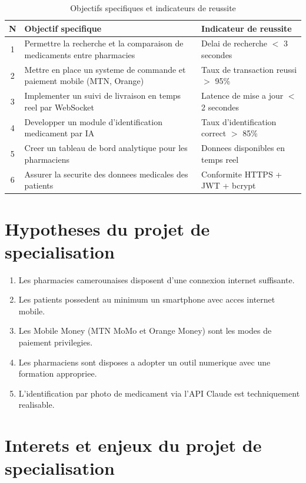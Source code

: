 \documentclass[12pt,a4paper]{report}
\begin{document}
\begin{table}[ht]
\centering
\caption{Objectifs specifiques et indicateurs de reussite}
\renewcommand{\arraystretch}{1.5}
\begin{tabularx}{\textwidth}{|c|X|X|}
\hline
\rowcolor{vertpharma!20}
\textbf{N} & \textbf{Objectif specifique} & \textbf{Indicateur de reussite} \\ \hline
1 & Permettre la recherche et la comparaison de medicaments entre pharmacies & Delai de recherche $<$ 3 secondes \\ \hline
2 & Mettre en place un systeme de commande et paiement mobile (MTN, Orange) & Taux de transaction reussi $>$ 95\% \\ \hline
3 & Implementer un suivi de livraison en temps reel par WebSocket & Latence de mise a jour $<$ 2 secondes \\ \hline
4 & Developper un module d'identification medicament par IA & Taux d'identification correct $>$ 85\% \\ \hline
5 & Creer un tableau de bord analytique pour les pharmaciens & Donnees disponibles en temps reel \\ \hline
6 & Assurer la securite des donnees medicales des patients & Conformite HTTPS + JWT + bcrypt \\ \hline
\end{tabularx}
\end{table}

\section{Hypotheses du projet de specialisation}

\begin{enumerate}[label=\textbf{H\arabic*.},leftmargin=*]
    \item Les pharmacies camerounaises disposent d'une connexion internet suffisante.
    \item Les patients possedent au minimum un smartphone avec acces internet mobile.
    \item Les Mobile Money (MTN MoMo et Orange Money) sont les modes de paiement privilegies.
    \item Les pharmaciens sont disposes a adopter un outil numerique avec une formation appropriee.
    \item L'identification par photo de medicament via l'API Claude est techniquement realisable.
\end{enumerate}

\section{Interets et enjeux du projet de specialisation}
\end{document}
